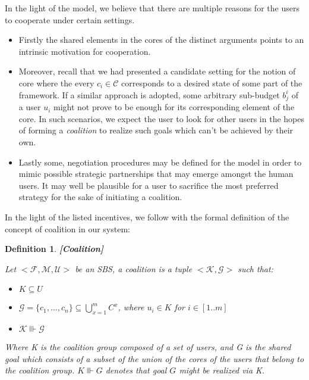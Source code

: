 \documentclass{article}
\newtheorem{definition}{Definition}
\begin{document}
In the light of the model, we believe that there are multiple reasons for the users to cooperate under certain settings. 
\begin{itemize}
\item Firstly the shared elements in the cores of the distinct arguments points to an intrinsic motivation for cooperation. 
\item Moreover, recall that we had presented a candidate setting for the notion of core   where the every $c_i \in \mathcal{C}$ corresponds to a desired state of some part of the framework. If a similar approach is adopted,  some arbitrary sub-budget  $b_j^i$ of a user $u_i$ might not prove to be enough for its corresponding element of the core. In such scenarios, we expect the user to look for other users in the hopes of forming a \emph{coalition} to realize such goals which can't be achieved by their own.   
\item Lastly some, negotiation procedures may be defined for the model in order to mimic possible strategic partnerships that may emerge amongst the human users. It may well be plausible for a user to sacrifice the most preferred strategy for the sake of initiating a coalition. 
\end{itemize}

In the light of the listed incentives, we follow with the formal definition of the concept of coalition in our system:

\begin{definition}\textbf{[Coalition]}

Let  $<\mathcal{F}, \mathcal{M}, \mathcal{U}>$ be an SBS, a coalition is a tuple $<\mathcal{K}, \mathcal{G}>$ such that:

\begin{itemize}
\item $K \subseteq U$
\item $\mathcal{G} = \{c_1,..., c_n\} \subseteq \bigcup_{x=1}^{m} C^{x} $, where  $u_i \in K$ for $i \in [1..m]$  %
\item $ \mathcal{K} \Vvdash \mathcal{G}$

\end{itemize}

Where K is the coalition group composed of a set of users, and G is the shared goal which consists of a subset of the union of the cores of the users that belong to the coalition group. $ K \Vvdash G$ denotes that goal $G$ might be realized via K.

\end{definition}
\end{document}

